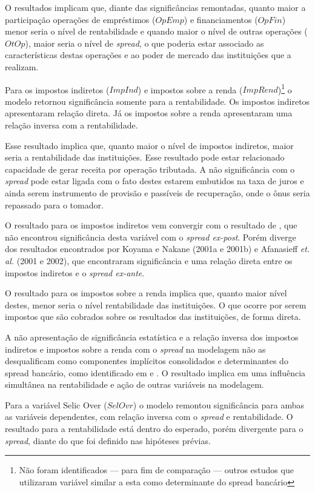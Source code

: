 \documentclass[
  12pt,
  12pt,
  openright,
  oneside,
  a4paper,
  chapter=TITLE,
  section=TITLE,
  subsection=TITLE,
  subsubsection=TITLE,
  portugues,
  sumario=tradicional]{abntex2}
\begin{document}
O resultados implicam que, diante das significâncias remontadas, quanto maior a participação operações de empréstimos (\(OpEmp\)) e financiamentos (\(OpFin\)) menor seria o nível de rentabilidade e quando maior o nível de outras operações (\(OtOp\)), maior seria o nível de \emph{spread}, o que poderia estar associado as características destas operações e ao poder de mercado das instituições que a realizam.

Para os impostos indiretos (\(ImpInd\)) e impostos sobre a renda (\(ImpRend\))\footnote{Não foram identificados — para fim de comparação — outros estudos que utilizaram variável similar a esta como determinante do spread bancário} o modelo retornou significância somente para a rentabilidade. Os impostos indiretos apresentaram relação direta. Já os impostos sobre a renda apresentaram uma relação inversa com a rentabilidade.

Esse resultado implica que, quanto maior o nível de impostos indiretos, maior seria a rentabilidade das instituições. Esse resultado pode estar relacionado capacidade de gerar receita por operação tributada. A não significância com o \emph{spread} pode estar ligada com o fato destes estarem embutidos na taxa de juros e ainda serem instrumento de provisão e passíveis de recuperação, onde o ônus seria repassado para o tomador.

O resultado para os impostos indiretos vem convergir com o resultado de \textcite{almeida:2013}, que não encontrou significância desta variável com o \emph{spread ex-post}. Porém diverge dos resultados encontrados por Koyama e Nakane (2001a e 2001b) e Afanasieff \emph{et. al.} (2001 e 2002), que encontraram significância e uma relação direta entre os impostos indiretos e o \emph{spread ex-ante}.

O resultado para os impostos sobre a renda implica que, quanto maior nível destes, menor seria o nível rentabilidade das instituições. O que ocorre por serem impostos que são cobrados sobre os resultados das instituições, de forma direta.

A não apresentação de significância estatística e a relação inversa dos impostos indiretos e impostos sobre a renda com o \emph{spread} na modelagem não as desqualificam como componentes implícitos consolidados e determinantes do spread bancário, como identificado em \textcite{BCB:1999} e \textcite{cardoso:1999}. O resultado implica em uma influência simultânea na rentabilidade e ação de outras variáveis na modelagem.

Para a variável Selic Over (\(SelOvr\)) o modelo remontou significância para ambas as variáveis dependentes, com relação inversa com o \emph{spread} e rentabilidade. O resultado para a rentabilidade está dentro do esperado, porém divergente para o \emph{spread}, diante do que foi definido nas hipóteses prévias.
\end{document}
